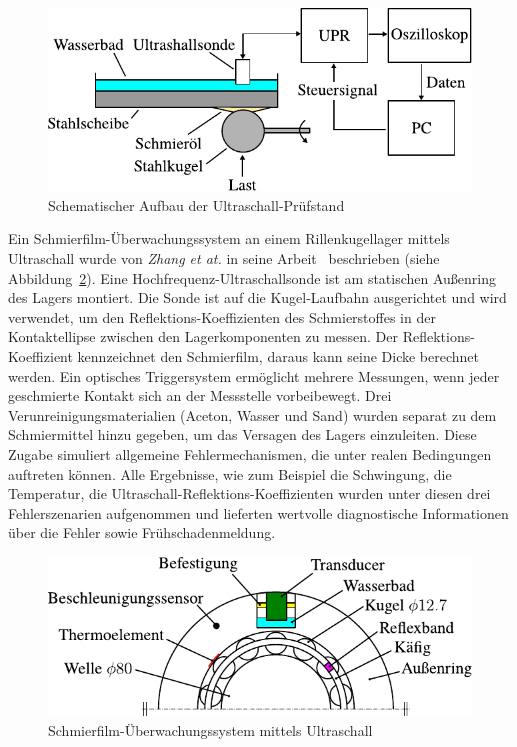 \begin{figure}[htb]
    \centering
    \includegraphics[]{./images/ultrashall_pruefstand_dwyer-joyce.pdf}
    \caption{Schematischer Aufbau der Ultraschall-Prüfstand~\cite{dwyer-joyce_2011}}
    \label{fig:ultrashall_pruefstand_dwyer-joyce}
\end{figure}

Ein Schmierfilm-Überwachungssystem an einem Rillenkugellager mittels Ultraschall wurde von \textit{Zhang et at.} in seine Arbeit~\cite{zhang_2006} beschrieben (siehe Abbildung~\ref{fig:ultrashall_rikula_zhang}).
Eine Hochfrequenz-Ultraschallsonde ist am statischen Außenring des Lagers montiert.
Die Sonde ist auf die Kugel-Laufbahn ausgerichtet und wird verwendet, um den Reflektions-Koeffizienten des Schmierstoffes in der Kontaktellipse zwischen den Lagerkomponenten zu messen.
Der Reflektions-Koeffizient kennzeichnet den Schmierfilm, daraus kann seine Dicke berechnet werden.
Ein optisches Triggersystem ermöglicht mehrere Messungen, wenn jeder geschmierte Kontakt sich an der Messstelle vorbeibewegt.
Drei Verunreinigungsmaterialien (Aceton, Wasser und Sand) wurden separat zu dem Schmiermittel hinzu gegeben, um das Versagen des Lagers einzuleiten.
Diese Zugabe simuliert allgemeine Fehlermechanismen, die unter realen Bedingungen auftreten können.
Alle Ergebnisse, wie zum Beispiel die Schwingung, die Temperatur, die Ultraschall-Reflektions-Koeffizienten wurden unter diesen drei Fehlerszenarien aufgenommen und lieferten wertvolle diagnostische Informationen über die Fehler sowie Frühschadenmeldung.

\begin{figure}[htb]
    \centering
    \includegraphics[]{./images/ultrashall_rikula_zhang.pdf}
    \caption{Schmierfilm-Überwachungssystem mittels Ultraschall~\cite{zhang_2006}}
    \label{fig:ultrashall_rikula_zhang}
\end{figure}

